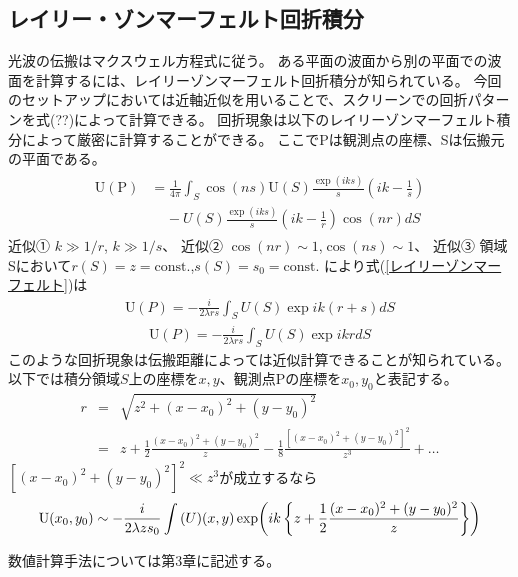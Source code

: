 \documentclass[a4paper,11pt,uplatex]{jsbook}
\begin{document}
\subsection{レイリー・ゾンマーフェルト回折積分}\label{sec:rayleigh}
光波の伝搬はマクスウェル方程式に従う。
ある平面の波面から別の平面での波面を計算するには、レイリーゾンマーフェルト回折積分が知られている。
今回のセットアップにおいては近軸近似を用いることで、スクリーンでの回折パターンを式(??)によって計算できる。
回折現象は以下のレイリーゾンマーフェルト積分によって厳密に計算することができる。
ここで$\text{P}$は観測点の座標、Sは伝搬元の平面である。
\begin{eqnarray}
  \begin{split}
  \text{U}(\text{P}) &= \frac{1}{4\pi}\int_{S}\cos(ns)\text{U}(S)\frac{\exp(iks)}{s}\left( ik - \frac{1}{s}\right) \\
      &~~~~~-U(S)\frac{\exp(iks)}{s}\left(ik- \frac{1}{r}\right)\cos(nr) dS
  \end{split}
  \label{レイリーゾンマーフェルト}
\end{eqnarray}
近似① $k \gg 1/r$, $k \gg 1/s$、
近似② $\cos(nr) \sim 1$,$\cos(ns) \sim 1$、
近似③ 領域Sにおいて$r(S)= z = \text{const.}$,$s(S) = s_0 = \text{const.}$
により式(\ref{レイリーゾンマーフェルト})は
\begin{eqnarray}
  \text{U}(P) = -\frac{i}{2\lambda rs} \int_{S} U(S)\exp ik(r+s) dS
  \label{レイリーゾンマーフェルト近似}
\end{eqnarray}
\begin{eqnarray}
  \text{U}(P) = -\frac{i}{2\lambda rs} \int_{S} U(S)\exp ikr dS
\end{eqnarray}
このような回折現象は伝搬距離によっては近似計算できることが知られている。以下では積分領域$S$上の座標を$x,y$、観測点Pの座標を$x_0,y_0$と表記する。
\begin{eqnarray}
  r &=& \sqrt{z^2 + (x-x_0)^2 + (y-y_0)^2}\\
  &=& z + \frac{1}{2}\frac{(x-x_0)^2 + (y-y_0)^2}{z} - \frac{1}{8}\frac{\left[(x-x_0)^2 + (y-y_0)^2\right]^2}{z^3} +\dots
\end{eqnarray}
$\left[(x-x_0)^2 + (y-y_0)^2\right]^2 \ll z^3$が成立するなら
\begin{eqnarray}
  \text{U}(x_0,y_0) \sim -\frac{i}{2\lambda zs_0}\int \text(U)(x,y) \exp(ik\left\{z +\frac{1}{2}\frac{(x-x_0)^2 + (y-y_0)^2}{z}\right\})
\end{eqnarray}

数値計算手法については第3章に記述する。
\end{document}
